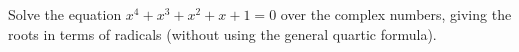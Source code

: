 Solve the equation $x^4+x^3+x^2+x+1=0$ over the complex numbers, giving the roots in terms of radicals (without using the general quartic formula).
